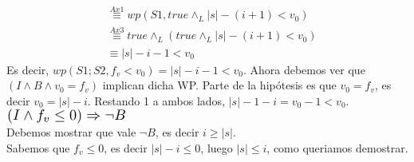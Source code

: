 \documentclass{article}
\begin{document}
\begin{enumerate}[label=\alph*)]
\begin{align*}
			&\stackrel{Ax1}{\equiv}wp(S1,true\wedge_L |s|-(i+1)<v_0)\\
			&\stackrel{Ax3}{\equiv}true\wedge_L(true\wedge_L  |s|-(i+1)<v_0)\\
			&\equiv |s|-i-1<v_0
	\end{align*}
	Es decir, $wp(S1;S2,f_v<v_0)=|s|-i-1<v_0$. Ahora debemos ver que $(I\wedge B\wedge v_0=f_v)$ implican dicha WP. Parte de la 
	hipótesis es que $v_0=f_v$, es decir $v_0=|s|-i$. Restando 1 a ambos lados, $|s|-1-i=v_0-1<v_0$.\medskip \\
	$\scalebox{1.3}{$(I\wedge f_v\leq 0)\Rightarrow \neg B$}$\medskip\\
	Debemos mostrar que vale $\neg B$, es decir $i\geq |s|$.\\
	Sabemos que $f_v\leq 0$, es decir $|s|-i\leq 0$, luego $|s|\leq i$, como queriamos demostrar.
\end{enumerate}

\end{document}
